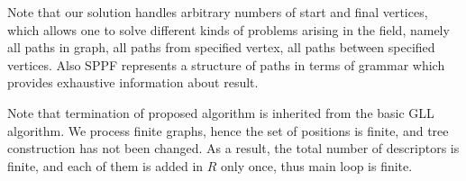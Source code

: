 Note that our solution handles arbitrary numbers of start and final vertices, which allows one to solve different kinds of problems arising in the field, namely all paths in graph, all paths from specified vertex, all paths between specified vertices. 
Also SPPF represents a structure of paths in terms of grammar which provides exhaustive information about result. 

Note that termination of proposed algorithm is inherited from the basic GLL algorithm.
We process finite graphs, hence the set of positions is finite, and tree construction has not been changed. 
As a result, the total number of descriptors is finite, and each of them is added in $R$ only once, thus main loop is finite.